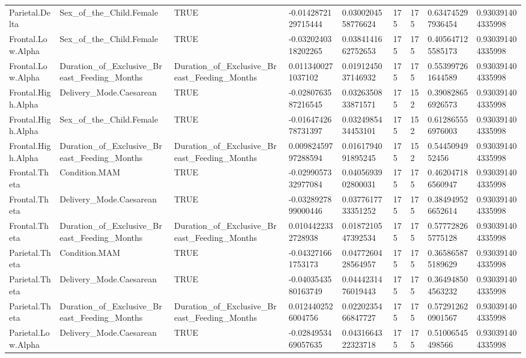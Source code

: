 \begin{longtable}{lllllllll}
Parietal.Delta & Sex\_of\_the\_Child.Female & TRUE & -0.0142872129715444 & 0.0300204558776624 & 175 & 175 & 0.634745297936454 & 0.930391404335998 \\
Frontal.Low.Alpha & Sex\_of\_the\_Child.Female & TRUE & -0.0320240318202265 & 0.0384141662752653 & 175 & 175 & 0.405647125585173 & 0.930391404335998 \\
Frontal.Low.Alpha & Duration\_of\_Exclusive\_Breast\_Feeding\_Months & Duration\_of\_Exclusive\_Breast\_Feeding\_Months & 0.0113400271037102 & 0.0191245037146932 & 175 & 175 & 0.553997261644589 & 0.930391404335998 \\
Frontal.High.Alpha & Delivery\_Mode.Caesarean & TRUE & -0.0280763587216545 & 0.0326350833871571 & 175 & 152 & 0.390828656926573 & 0.930391404335998 \\
Frontal.High.Alpha & Sex\_of\_the\_Child.Female & TRUE & -0.0164742678731397 & 0.0324985434453101 & 175 & 152 & 0.612865556976003 & 0.930391404335998 \\
Frontal.High.Alpha & Duration\_of\_Exclusive\_Breast\_Feeding\_Months & Duration\_of\_Exclusive\_Breast\_Feeding\_Months & 0.00982459797288594 & 0.0161794091895245 & 175 & 152 & 0.5445094952456 & 0.930391404335998 \\
Frontal.Theta & Condition.MAM & TRUE & -0.0299057332977084 & 0.0405693902800031 & 175 & 175 & 0.462047186560947 & 0.930391404335998 \\
Frontal.Theta & Delivery\_Mode.Caesarean & TRUE & -0.0328927899000446 & 0.0377617733351252 & 175 & 175 & 0.384949526652614 & 0.930391404335998 \\
Frontal.Theta & Duration\_of\_Exclusive\_Breast\_Feeding\_Months & Duration\_of\_Exclusive\_Breast\_Feeding\_Months & 0.0104422332728938 & 0.0187210547392534 & 175 & 175 & 0.577728265775128 & 0.930391404335998 \\
Parietal.Theta & Condition.MAM & TRUE & -0.043271661753173 & 0.0477260428564957 & 175 & 175 & 0.365865875189629 & 0.930391404335998 \\
Parietal.Theta & Delivery\_Mode.Caesarean & TRUE & -0.0403543580163749 & 0.0444231476019443 & 175 & 175 & 0.364948504563232 & 0.930391404335998 \\
Parietal.Theta & Duration\_of\_Exclusive\_Breast\_Feeding\_Months & Duration\_of\_Exclusive\_Breast\_Feeding\_Months & 0.0124402526004756 & 0.0220235466847727 & 175 & 175 & 0.572912620901567 & 0.930391404335998 \\
Parietal.Low.Alpha & Delivery\_Mode.Caesarean & TRUE & -0.0284953469057635 & 0.0431664322323718 & 175 & 175 & 0.51006545498566 & 0.930391404335998 \\

\end{longtable}
